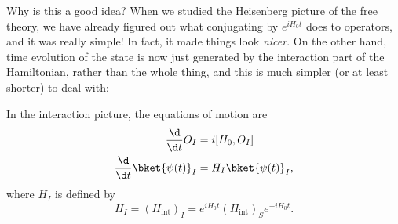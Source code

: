 \documentclass[a4paper]{article}
\begin{document}
Why is this a good idea? When we studied the Heisenberg picture of the free theory, we have already figured out what conjugating by $e^{iH_0 t}$ does to operators, and it was really simple! In fact, it made things look \emph{nicer}. On the other hand, time evolution of the state is now just generated by the interaction part of the Hamiltonian, rather than the whole thing, and this is much simpler (or at least shorter) to deal with:

\begin{prop}
  In the interaction picture, the equations of motion are
  \begin{align*}
    \frac{\d}{\d t}O_I &= i [H_0, O_I]\\
    \frac{\d}{\d t}\bket{\psi(t)}_I &= H_I\bket{\psi(t)}_I,
  \end{align*}
  where $H_I$ is defined by
  \[
    H_I = (H_{\mathrm{int}})_I = e^{iH_0 t} (H_{\mathrm{int}})_S e^{-iH_0 t}.
  \]
\end{prop}
\end{document}
